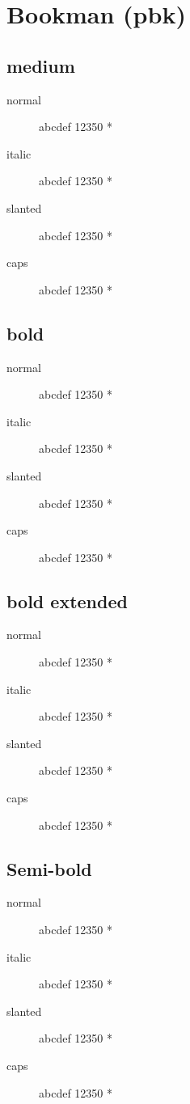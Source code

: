 \section{Bookman (pbk)}

\subsection{medium}
\begin{description}
    \item [normal]  abcdef 12350 *
    \item [italic]  abcdef 12350 *
    \item [slanted]  abcdef 12350 *
    \item [caps]  abcdef 12350 *
\end{description}
    
\subsection{bold}
\begin{description}
    \item [normal]  abcdef 12350 *
    \item [italic]  abcdef 12350 *
    \item [slanted]  abcdef 12350 *
    \item [caps]  abcdef 12350 *
\end{description}
    
\subsection{bold extended}
\begin{description}
    \item [normal]  abcdef 12350 *
    \item [italic]  abcdef 12350 *
    \item [slanted]  abcdef 12350 *
    \item [caps]  abcdef 12350 *
\end{description}

\subsection{Semi-bold}
\begin{description}
    \item [normal]  abcdef 12350 *
    \item [italic]  abcdef 12350 *
    \item [slanted]  abcdef 12350 *
    \item [caps]  abcdef 12350 *
\end{description}

